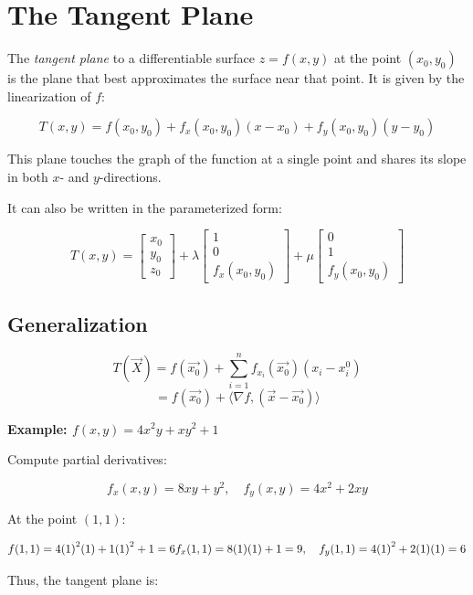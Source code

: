 \section{The Tangent Plane}

The \emph{tangent plane} to a differentiable surface \( z = f(x, y) \) at the point \( (x_0, y_0) \) is the 
plane that best approximates the surface near that point. It is given by the linearization of \(f\):

\[
    T(x, y) = f(x_0, y_0) + f_x(x_0, y_0)(x - x_0) + f_y(x_0, y_0)(y - y_0)
\]

This plane touches the graph of the function at a single point 
and shares its slope in both \(x\)- and \(y\)-directions.

It can also be written in the parameterized form:

\[
    T(x,y) = \begin{bmatrix} x_0\\ y_0\\ z_0\end{bmatrix} + \lambda 
    \begin{bmatrix} 1\\ 0 \\ f_x(x_0,y_0)\end{bmatrix} + \mu \begin{bmatrix}
    0 \\ 1 \\ f_y(x_0, y_0)
    \end{bmatrix}
\]

\subsection{Generalization}

\[
    T(\vec{X}) = f(\vec{x_0}) + \sum_{i = 1}^{n} f_{x_i}(\vec{x_0})(x_i - x_{i}^0)
\]
\[
    = f(\vec{x_0}) + \langle \nabla f, (\vec{x} - \vec{x_0})\rangle
\]

\textbf{Example: \( f(x, y) = 4x^2y + xy^2 + 1 \)}

Compute partial derivatives:

\[
    f_x(x, y) = 8xy + y^2, \quad f_y(x, y) = 4x^2 + 2xy
\]

At the point \( (1, 1) \):

\[
    f(1, 1) = 4{(1)}^2(1) + 1{(1)}^2 + 1 = 6 \\
    f_x(1, 1) = 8(1)(1) + 1 = 9, \quad f_y(1, 1) = 4{(1)}^2 + 2(1)(1) = 6
\]

Thus, the tangent plane is:

